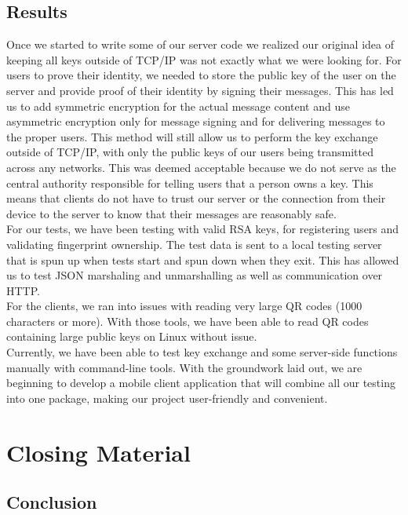 \documentclass[11pt]{article}
\begin{document}
\subsection{Results}
Once we started to write some of our server code we realized our original idea of keeping all keys outside of TCP/IP was not exactly what we were looking for. For users to prove their identity, we needed to store the public key of the user on the server and provide proof of their identity by signing their messages. This has led us to add symmetric encryption for the actual message content and use asymmetric encryption only for message signing and for delivering messages to the proper users. This method will still allow us to perform the key exchange outside of TCP/IP, with only the public keys of our users being transmitted across any networks. This was deemed acceptable because we do not serve as the central authority responsible for telling users that a person owns a key. This means that clients do not have to trust our server or the connection from their device to the server to know that their messages are reasonably safe.\\

For our tests, we have been testing with valid RSA keys, for registering users and validating fingerprint ownership. The test data is sent to a local testing server that is spun up when tests start and spun down when they exit. This has allowed us to test JSON marshaling and unmarshalling as well as communication over HTTP.\\

For the clients, we ran into issues with reading very large QR codes (1000 characters or more). With those tools, we have been able to read QR codes containing large public keys on Linux without issue. \\

Currently, we have been able to test key exchange and some server-side functions manually with command-line tools. With the groundwork laid out, we are beginning to develop a mobile client application that will combine all our testing into one package, making our project user-friendly and convenient.

\newpage
\section{Closing Material}
\subsection{Conclusion}
\end{document}
